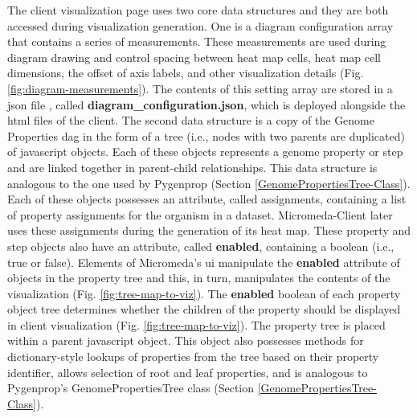 The client visualization page uses two core data structures and they are both accessed during visualization generation. One is a diagram configuration array that contains a series of measurements. These measurements are used during diagram drawing and control spacing between heat map cells, heat map cell dimensions, the offset of axis labels, and other visualization details (Fig. \ref{fig:diagram-measurements}). The contents of this setting array are stored in a \gls{json} file \cite{bray2014rfc}, called \textbf{diagram\_configuration.json}, which is deployed alongside the \gls{html} files of the client. The second data structure is a copy of the Genome Properties \gls{dag} in the form of a tree (i.e., nodes with two parents are duplicated) of \gls{javascript} objects. Each of these objects represents a genome property or step and are linked together in parent-child relationships. This data structure is analogous to the one used by Pygenprop (Section \ref{GenomePropertiesTree-Class}). Each of these objects possesses an attribute, called assignments, containing a list of property assignments for the organism in a dataset. Micromeda-Client later uses these assignments during the generation of its heat map. These property and step objects also have an attribute, called \textbf{enabled}, containing a boolean (i.e., true or false). Elements of Micromeda's \gls{ui} manipulate the \textbf{enabled} attribute of objects in the property tree and this, in turn, manipulates the contents of the visualization (Fig. \ref{fig:tree-map-to-viz}). The \textbf{enabled} boolean of each property object tree determines whether the children of the property should be displayed in client visualization (Fig. \ref{fig:tree-map-to-viz}). The property tree is placed within a parent \gls{javascript} object. This object also possesses methods for dictionary-style lookups of properties from the tree based on their property identifier, allows selection of root and leaf properties, and is analogous to Pygenprop's GenomePropertiesTree class (Section \ref{GenomePropertiesTree-Class}).

